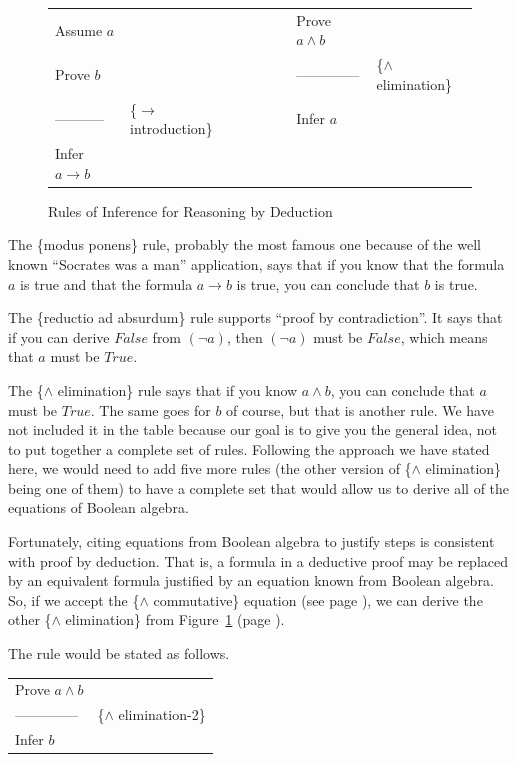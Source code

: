 \begin{figure}
\begin{center}
\begin{tabular}{lllll}
Assume $a$               &                              &~~~~~& Prove $a \wedge b$                 & \\
Prove $b$                &                              &~~~~~& --------------                     &\{$\wedge$ elimination\} \\
-----------              &\{$\rightarrow$ introduction\}&~~~~~& Infer $a$                          & \\
Infer $a \rightarrow b$  &                              &~~~~~&                                    & \\
\end{tabular}
\end{center}
\caption{Rules of Inference for Reasoning by Deduction}
\label{fig-02-deduction-rules}
\end{figure}

The \{modus ponens\} rule, probably the most famous one because
of the well known ``Socrates was a man'' application, says that if you know that
the formula $a$ is true and that the formula $a \rightarrow b$ is true,
you can conclude that $b$ is true.

The \{reductio ad absurdum\} rule supports ``proof by contradiction''.
It says that if you can derive $False$
from $(\neg a)$, then $(\neg a)$ must be $False$, which means that $a$ must
be $True$.

The \{$\wedge$ elimination\} rule says that if you know $a \wedge b$,
you can conclude that $a$ must be $True$. The same goes for $b$ of
course, but that is another rule. We have not included it in the table because
our goal is to give you the general idea, not to put together a complete
set of rules. Following the approach we have stated here,
we would need to add five more rules
(the other version of \{$\wedge$ elimination\} being one of them)
to have a complete set that would allow us to derive all of the
equations of Boolean algebra.

Fortunately, citing equations from Boolean algebra to justify
steps is consistent with proof by deduction. That is, a formula
in a deductive proof may be replaced by an equivalent formula
justified by an equation known from Boolean algebra. So, if we
accept the \{$\wedge$ commutative\} equation (see page \pageref{and-commutative}),
we can derive the other \{$\wedge$ elimination\} from
Figure~\ref{fig-02-deduction-rules} (page \pageref{fig-02-deduction-rules}).

The rule would be stated as follows.
\begin{center}
\begin{tabular}{ll}
Prove $a \wedge b$                 & \\
--------------                     &\{$\wedge$ elimination-2\} \\
Infer $b$                          & \\
\end{tabular}
\end{center}

